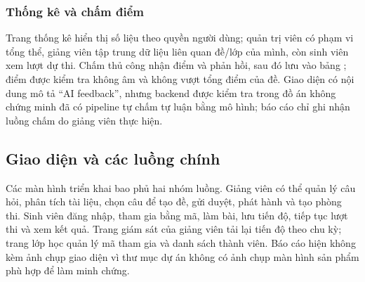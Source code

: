 \subsubsection{Thống kê và chấm điểm}
Trang thống kê hiển thị số liệu theo quyền người dùng; quản trị viên có
phạm vi tổng thể, giảng viên tập trung dữ liệu liên quan đề/lớp của mình,
còn sinh viên xem lượt dự thi. Chấm thủ công nhận điểm và phản hồi, sau đó
lưu vào bảng ; điểm được kiểm tra không âm và không vượt tổng
điểm của đề. Giao diện có nội dung mô tả “AI feedback”, nhưng backend được
kiểm tra trong đồ án không chứng minh đã có pipeline tự chấm tự luận bằng
mô hình; báo cáo chỉ ghi nhận luồng chấm do giảng viên thực hiện.

\subsection{Giao diện và các luồng chính}

Các màn hình triển khai bao phủ hai nhóm luồng. Giảng viên có thể quản lý
câu hỏi, phân tích tài liệu, chọn câu để tạo đề, gửi duyệt, phát hành và
tạo phòng thi. Sinh viên đăng nhập, tham gia bằng mã, làm bài, lưu tiến độ,
tiếp tục lượt thi và xem kết quả. Trang giám sát của giảng viên tải lại
tiến độ theo chu kỳ; trang lớp học quản lý mã tham gia và danh sách thành
viên. Báo cáo hiện không kèm ảnh chụp giao diện vì thư mục dự án không có
ảnh chụp màn hình sản phẩm phù hợp để làm minh chứng.

